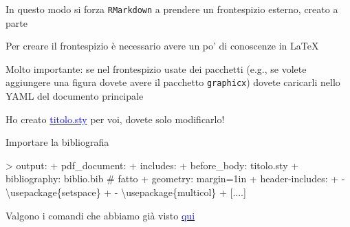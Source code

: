\documentclass[
  ignorenonframetext,
]{beamer}
\newenvironment{Shaded}{}{}
\newcommand{\BuiltInTok}[1]{#1}
\newcommand{\ExtensionTok}[1]{#1}
\newcommand{\NormalTok}[1]{#1}
\begin{document}
\begin{frame}[fragile]{}
\protect\hypertarget{section-5}{}
In questo modo si forza \texttt{RMarkdown} a prendere un frontespizio
esterno, creato a parte

Per creare il frontespizio è necessario avere un po' di conoscenze in
\LaTeX

Molto importante: se nel frontespizio usate dei pacchetti (e.g., se
volete aggiungere una figura dovete avere il pacchetto
\texttt{graphicx}) dovete caricarli nello YAML del documento principale

Ho creato
\href{https://drive.google.com/file/d/1O4YgvAZnPJbNMOz0tugz5xf75TTxVvlY/view?usp=sharing}{\textcolor{blue}{titolo.sty}}
per voi, dovete solo modificarlo!
\end{frame}

\begin{frame}[fragile]{Importare la bibliografia}
\protect\hypertarget{importare-la-bibliografia}{}
\begin{Shaded}
\begin{Highlighting}[]
\NormalTok{\textgreater{} output: }
\NormalTok{+    pdf\_document:}
\NormalTok{+       includes:}
\NormalTok{+         before\_body: titolo.sty}
\NormalTok{+ bibliography: biblio.bib \# fatto}
\NormalTok{+ geometry: margin=1in}
\NormalTok{+ header{-}includes:}
\NormalTok{+   {-} }\BuiltInTok{\textbackslash{}usepackage}\NormalTok{\{}\ExtensionTok{setspace}\NormalTok{\} }
\NormalTok{+   {-} }\BuiltInTok{\textbackslash{}usepackage}\NormalTok{\{}\ExtensionTok{multicol}\NormalTok{\}}
\NormalTok{+ [....]}
\end{Highlighting}
\end{Shaded}

Valgono i comandi che abbiamo già visto
\href{https://ottaviae.github.io/CorsoRmarkdown/slides/01\%20-\%20Baby\%20Steps/01-Baby-Steps.html\#38}{\textcolor{blue}{qui}}
\end{frame}
\end{document}
